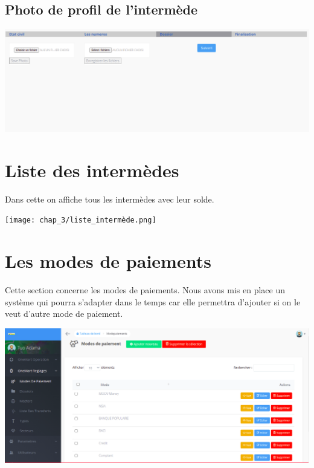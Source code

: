 		\subsection*{Photo de profil de l'intermède}
		\begin{center}
			\includegraphics[scale=0.4]{chap_3/ajout-intermed-dossier.png}
			\label{ajouter_intermede-dossier}
		\end{center}
			
	\section{Liste des intermèdes}
		Dans cette on affiche tous les intermèdes avec leur solde.\\
		\begin{center}
			\texttt{[image: chap\_3/liste\_intermède.png]}
			\label{liste_intermede}
		\end{center}
	\section{Les modes de paiements}
		Cette section concerne les modes de paiements. Nous avons mis en place un système qui pourra s'adapter dans le temps  car elle permettra d'ajouter si on le veut d'autre mode de paiement.\\
		\begin{center}
			\includegraphics[scale=0.4]{chap_3/mode_paiement.png}
			\label{mode_de_paiement}
		\end{center}
